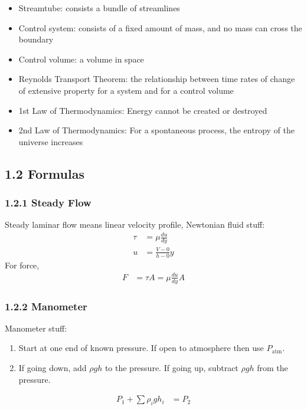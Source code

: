 \begin{itemize}
    \item Streamtube: consists a bundle of streamlines
    \item Control system: consists of a fixed amount of mass, and no mass can cross the boundary
    \item Control volume: a volume in space
    \item Reynolds Transport Theorem: the relationship between time rates of change of extensive property for a system and for a control volume
    \item 1st Law of Thermodynamics: Energy cannot be created or destroyed
    \item 2nd Law of Thermodynamics: For a spontaneous process, the entropy of the universe increases
\end{itemize}
\subsection{1.2 Formulas}
\subsubsection{1.2.1 Steady Flow}
Steady laminar flow means linear velocity profile, Newtonian fluid stuff:
\begin{align*}
    \tau &= \mu \frac{du}{dy} \\
    u &= \frac{V - 0}{h - 0}y 
\end{align*}
For force,
\begin{align*}
    F &= \tau A = \mu \frac{du}{dy} A 
\end{align*}
\subsubsection{1.2.2 Manometer}
Manometer stuff: 
\begin{enumerate}[label=\roman*)]
    \item Start at one end of known pressure. If open to atmosphere then use $P_{\text{atm}}$.
    \item If going down, add $\rho g h$ to the pressure. If going up, subtract $\rho g h$ from the pressure.
\end{enumerate}
\begin{align*}
    P_1 + \sum \rho_i g h_i &= P_2
\end{align*}
